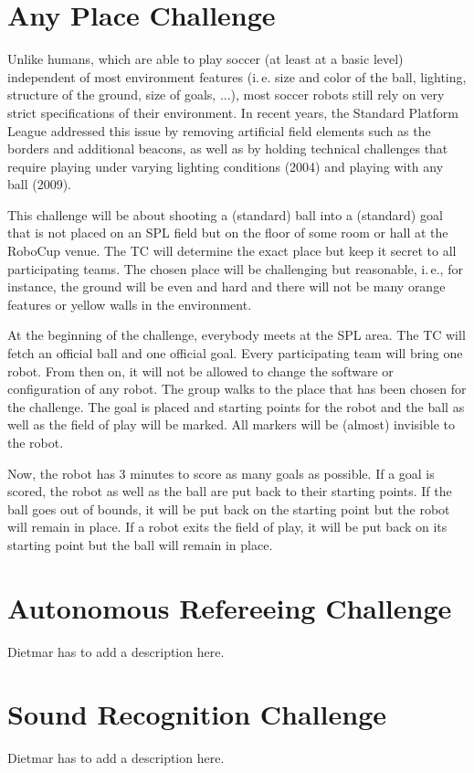\documentclass[12pt]{article}
\newcommand{\ie}{\mbox{i.\,e.}\xspace}
\begin{document}
\newpage






\section{Any Place Challenge}

Unlike humans, which are able to play soccer (at least at a basic level) independent of most environment features (\ie size and color of the ball, lighting, structure of the ground, size of goals, ...), most soccer robots still rely on very strict specifications of their environment. In recent years, the Standard Platform League addressed this issue by removing artificial field elements such as the borders and additional beacons, as well as by holding technical challenges that require playing under varying lighting conditions (2004) and playing with any ball (2009).

This challenge will be about shooting a (standard) ball into a (standard) goal that is not placed on an SPL field but on the floor of some room or hall at the RoboCup venue. The TC will determine the exact place but keep it secret to all participating teams. The chosen place will be challenging but reasonable, \ie, for instance, the ground will be even and hard and there will not be many orange features or yellow walls in the environment.

At the beginning of the challenge, everybody meets at the SPL area. The TC will fetch an official ball and one official goal. Every participating team will bring one robot. From then on, it will not be allowed to change the software or configuration of any robot. The group walks to the place that has been chosen for the challenge. The goal is placed and starting points for the robot and the ball as well as the field of play will be marked. All markers will be (almost) invisible to the robot. 

Now, the robot has 3 minutes to score as many goals as possible. If a goal is scored, the robot as well as the ball are put back to their starting points. If the ball goes out of bounds, it will be put back on the starting point but the robot will remain in place. If a robot exits the field of play, it will be put back on its starting point but the ball will remain in place.


\newpage






\section{Autonomous Refereeing Challenge}

Dietmar has to add a description here.

\newpage





\section{Sound Recognition Challenge}

Dietmar has to add a description here.
\end{document}
